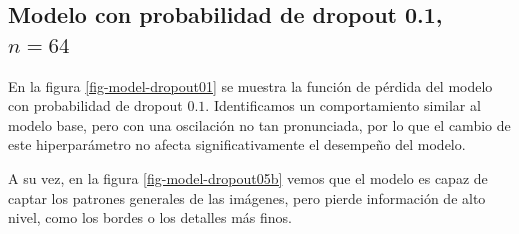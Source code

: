 \documentclass[aps,prl,reprint,groupedaddress]{revtex4-2}
\begin{document}
\subsection{Modelo con probabilidad de dropout 0.1, $n=64$}

En la figura \ref{fig-model-dropout01} se muestra la función de pérdida del
modelo con probabilidad de dropout $0.1$. Identificamos un comportamiento 
similar al modelo base, pero con una oscilación no tan pronunciada, por lo que el 
cambio de este hiperparámetro no afecta significativamente el desempeño del modelo.

A su vez, en la figura \ref{fig-model-dropout05b} vemos que el modelo es capaz de 
captar los patrones generales de las imágenes, pero pierde información de alto 
nivel, como los bordes o los detalles más finos.
\end{document}
